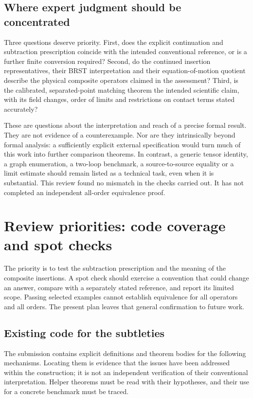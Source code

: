 \documentclass[11pt]{article}
\begin{document}
\subsection{Where expert judgment should be concentrated}

Three questions deserve priority. First, does the explicit continuation
and subtraction prescription coincide with the intended conventional
reference, or is a further finite conversion required? Second, do the
continued insertion representatives, their BRST interpretation and their
equation-of-motion quotient describe the physical composite operators
claimed in the assessment? Third, is the calibrated, separated-point
matching theorem the intended scientific claim, with its field changes,
order of limits and restrictions on contact terms stated accurately?

These are questions about the interpretation and reach of a precise
formal result. They are not evidence of a counterexample. Nor are they
intrinsically beyond formal analysis: a sufficiently explicit external
specification would turn much of this work into further comparison
theorems. In contrast, a generic tensor identity, a graph enumeration,
a two-loop benchmark, a source-to-source equality or a limit estimate
should remain listed as a technical task, even when it is substantial.
This review found no mismatch in the checks carried out. It has not
completed an independent all-order equivalence proof.

\section{Review priorities: code coverage and spot checks}
\label{sec:review-plan}

The priority is to test the subtraction prescription and the meaning of
the composite insertions. A spot check should exercise a convention that
could change an answer, compare with a separately stated reference, and
report its limited scope. Passing selected examples cannot establish
equivalence for all operators and all orders. The present plan leaves that
general confirmation to future work.

\subsection{Existing code for the subtleties}

The submission contains explicit definitions and theorem bodies for the
following mechanisms. Locating them is evidence that the issues have been
addressed within the construction; it is not an independent verification
of their conventional interpretation. Helper theorems must be read with
their hypotheses, and their use for a concrete benchmark must be traced.
\end{document}

